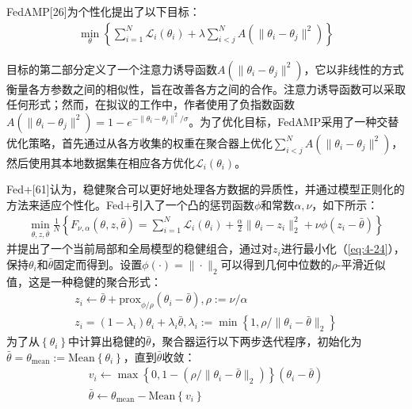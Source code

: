FedAMP[26]为个性化提出了以下目标：
\begin{align}
	\min_{\theta} \left\{ \sum_{i=1}^{N} \mathcal{L}_{i}(\theta_{i}) + \lambda \sum_{i < j}^{N} A(\|\theta_{i} - \theta_{j}\|^{2}) \right\} \label{eq:4-23}
\end{align}

目标的第二部分定义了一个注意力诱导函数$A(\|\theta_{i} - \theta_{j}\|^{2})$，它以非线性的方式衡量各方参数之间的相似性，旨在改善各方之间的合作。注意力诱导函数可以采取任何形式；然而，在拟议的工作中，作者使用了负指数函数$A(\|\theta_{i} - \theta_{j}\|^{2}) = 1 - e^{-\|\theta_{i} - \theta_{j}\|^{2}/\sigma}$。为了优化目标，FedAMP采用了一种交替优化策略，首先通过从各方收集的权重在聚合器上优化$\sum_{i<j}^{N} A(\|\theta_{i} - \theta_{j}\|^{2})$，然后使用其本地数据集在相应各方优化$\mathcal{L}_{i}(\theta_{i})$。

Fed+[61]认为，稳健聚合可以更好地处理各方数据的异质性，并通过模型正则化的方法来适应个性化。Fed+引入了一个凸的惩罚函数$\phi$和常数$\alpha, \nu$，如下所示：
\begin{align}
	\min_{\theta, z, \bar{\theta}} \frac{1}{N} \left\{ F_{\nu, \alpha}(\theta, z, \bar{\theta}) = \sum_{i=1}^{N} \mathcal{L}_{i}(\theta_{i}) + \frac{\alpha}{2} \|\theta_{i} - z_{i}\|_{2}^{2} + \nu \phi (z_{i} - \bar{\theta}) \right\} \label{eq:4-24}
\end{align}
并提出了一个当前局部和全局模型的稳健组合，通过对$z_{i}$进行最小化（\ref{eq:4-24}），保持$\theta_{i}$和$\bar{\theta}$固定而得到。设置$\phi(\cdot) = \|\cdot\|_{2}$可以得到几何中位数的$\rho$-平滑近似值，这是一种稳健的聚合形式：
\begin{align*}
	z_{i} \leftarrow \bar{\theta} + \text{prox}_{\phi / \rho}(\theta_{i} - \bar{\theta}), \rho := \nu / \alpha \\
	z_{i} = (1 - \lambda_{i}) \theta_{i} + \lambda_{i}\bar{\theta}, \lambda_{i} := \min \left\{ 1, \rho / \|\theta_{i} - \bar{\theta}\|_{2} \right\}
\end{align*}
为了从$\left\{\theta_{i}\right\}$中计算出稳健的$\bar{\theta}$，聚合器运行以下两步迭代程序，初始化为$	\bar{\theta} = \theta_{\text{mean}} := \text{Mean}\left\{ \theta_{i} \right\}$，直到$\bar{\theta}$收敛：
\begin{align*}
	v_{i} \leftarrow \max \left\{ 0, 1 - (\rho / \|\theta_{i} - \bar{\theta}\|_{2}) \right\}(\theta_{i} - \bar{\theta}) \\
	\bar{\theta} \leftarrow \theta_{\text{mean}} - \text{Mean}\left\{ v_{i} \right\}
\end{align*}

